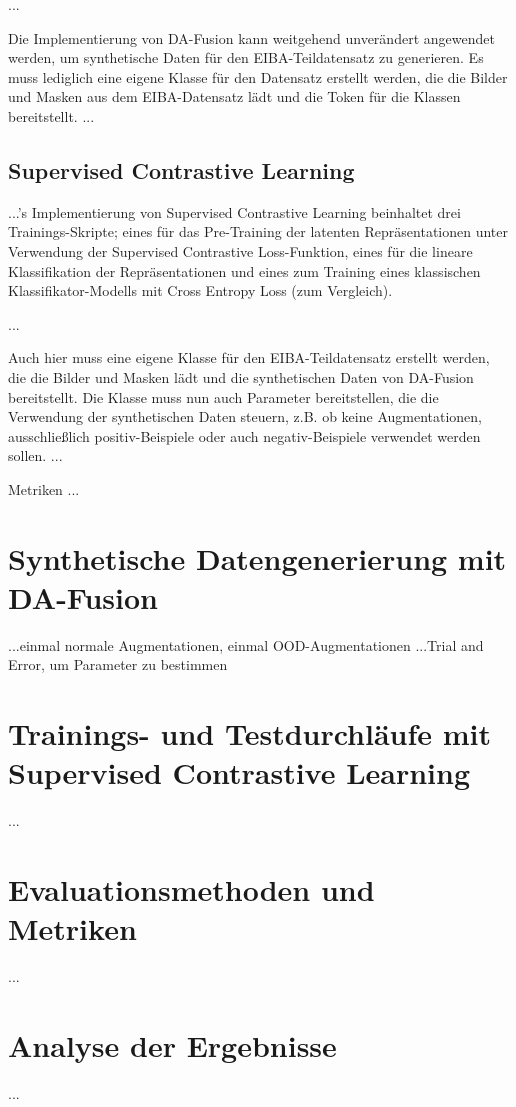 ...

Die Implementierung von DA-Fusion kann weitgehend unverändert angewendet werden, um synthetische Daten für den EIBA-Teildatensatz zu generieren. Es muss lediglich eine eigene Klasse für den Datensatz erstellt werden, die die Bilder und Masken aus dem EIBA-Datensatz lädt und die Token für die Klassen bereitstellt. ...

\subsection{Supervised Contrastive Learning}

...'s Implementierung von Supervised Contrastive Learning beinhaltet drei Trainings-Skripte; eines für das Pre-Training der latenten Repräsentationen unter Verwendung der Supervised Contrastive Loss-Funktion, eines für die lineare Klassifikation der Repräsentationen und eines zum Training eines klassischen Klassifikator-Modells mit Cross Entropy Loss (zum Vergleich).

...

Auch hier muss eine eigene Klasse für den EIBA-Teildatensatz erstellt werden, die die Bilder und Masken lädt und die synthetischen Daten von DA-Fusion bereitstellt. Die Klasse muss nun auch Parameter bereitstellen, die die Verwendung der synthetischen Daten steuern, z.B. ob keine Augmentationen, ausschließlich positiv-Beispiele oder auch negativ-Beispiele verwendet werden sollen. ...

Metriken ...

\section{Synthetische Datengenerierung mit DA-Fusion}

...einmal normale Augmentationen, einmal OOD-Augmentationen
...Trial and Error, um Parameter zu bestimmen

\section{Trainings- und Testdurchläufe mit Supervised Contrastive Learning}

...

\section{Evaluationsmethoden und Metriken}

...

\section{Analyse der Ergebnisse}

...